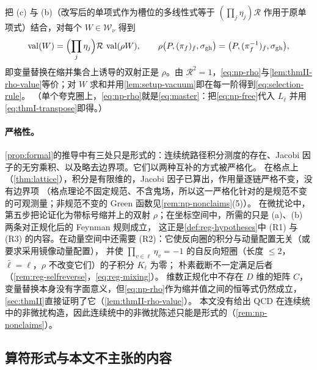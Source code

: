\documentclass[UTF8,a4paper,11pt,fontset=fandol]{ctexart}
\makeatletter
\theoremstyle{cplain}
\theoremstyle{cdefinition}
\theoremstyle{cremark}
\renewcommand{\proofname}{证明}
\renewenvironment{proof}[1][\proofname]{\par\pushQED{\qed}\normalfont\topsep6\p@\@plus6\p@\relax
  \trivlist\item[\hskip\labelsep\itshape #1\hspace{0.5em}]\ignorespaces}{\popQED\endtrivlist\@endpefalse}
\numberwithin{equation}{section}
\newcommand{\Rop}{\mathcal{R}}                       %
\makeatother
\begin{document}
\begin{proof}[推导]
\begin{enumerate}[label=(\alph*),leftmargin=1.8em,itemsep=1pt,topsep=2pt]
\end{enumerate}
把 (c) 与 (b)（改写后的单项式作为槽位的多线性式等于 $(\prod_j\eta_j)\Rop$ 作用于原单项式）结合，对每个 $W\in\mathcal W_\nu$ 得到
\begin{equation}\label{eq:np-rho}
\operatorname{val}(W)=\Bigl(\prod_{j}\eta_j\Bigr)\Rop\,\operatorname{val}(\rho W),\qquad \rho\bigl(P,(\pi_f)_f,\sigma_{\mathrm{gh}}\bigr)=\bigl(P,(\pi_f^{-1})_f,\sigma_{\mathrm{gh}}\bigr),
\end{equation}
即变量替换在缩并集合上诱导的双射正是 $\rho$。由 $\Rop^2=1$，\cref{eq:np-rho}与\cref{lem:thmII-rho-value}等价；对 $W$ 求和并用\cref{lem:setup-vacuum}即在每一阶得到\cref{eq:selection-rule}。
（单个夸克圈上，\cref{eq:np-rho}就是\cref{eq:master}：把\cref{eq:np-free}代入 $L_{\bar\ell}$ 并用\cref{eq:thmI-transpose}即得。）
\end{proof}

\paragraph{严格性。}\cref{prop:formal}的推导中有三处只是形式的：连续统路径积分测度的存在、Jacobi 因子的无穷乘积、以及略去边界项。它们以两种互补的方式被严格化。
在格点上（\cref{thm:lattice}），积分是有限维的，Jacobi 因子已算出，作用量逐链严格不变，没有边界项
（格点理论不固定规范、不含鬼场，所以这一严格化针对的是规范不变的可观测量；非规范不变的 Green 函数见\cref{rem:np-nonclaims}(5)）。
在微扰论中，第五步把论证化为带标号缩并上的双射 $\rho$；在坐标空间中，所需的只是 (a)、(b) 两条对正规化后的 Feynman 规则成立，
这正是\cref{def:reg-hypotheses}中 (R1) 与 (R3) 的内容。在动量空间中还需要 (R2)：它使反向圈的积分与动量配置无关（或要求采用镜像动量配置），
并使 $\prod_{v\in\ell}\eta_v=-1$ 的自反向短圈（长度 $\le2$，$\bar\ell=\ell$，$\rho$ 不改变它们）的子积分 $K_\ell$ 为零；
朴素截断不一定满足后者（\cref{rem:reg-selfreverse}，\cref{eq:reg-mixing}）。
维数正规化中不存在 $D$ 维的矩阵 $C$，变量替换本身没有字面意义，但\cref{eq:np-rho}作为缩并值之间的恒等式仍然成立，\cref{sec:thmII}直接证明了它（\cref{lem:thmII-rho-value}）。
本文没有给出 QCD 在连续统中的非微扰构造，因此连续统中的非微扰陈述只能是形式的（\cref{rem:np-nonclaims}）。

\subsection{算符形式与本文不主张的内容}\label{sec:nonpert-operator}
\end{document}
